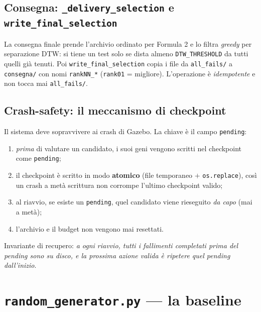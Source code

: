 \documentclass[11pt,a4paper]{report}
\newcommand{\code}[1]{\texttt{#1}}
\begin{document}
\subsection{Consegna: \texttt{\_delivery\_selection} e \texttt{write\_final\_selection}}
La consegna finale prende l'archivio ordinato per Formula 2 e lo filtra
\emph{greedy} per separazione DTW: si tiene un test solo se dista almeno
\code{DTW\_THRESHOLD} da tutti quelli già tenuti. Poi
\code{write\_final\_selection} copia i file da \code{all\_fails/} a
\code{consegna/} con nomi \code{rankNN\_*} (\code{rank01} = migliore).
L'operazione è \emph{idempotente} e non tocca mai \code{all\_fails/}.

\subsection{Crash-safety: il meccanismo di checkpoint}
Il sistema deve sopravvivere ai crash di Gazebo. La chiave è il campo
\code{pending}:
\begin{enumerate}
  \item \emph{prima} di valutare un candidato, i suoi geni vengono
        scritti nel checkpoint come \code{pending};
  \item il checkpoint è scritto in modo \textbf{atomico} (file temporaneo
        $+$ \code{os.replace}), così un crash a metà scrittura non
        corrompe l'ultimo checkpoint valido;
  \item al riavvio, se esiste un \code{pending}, quel candidato viene
        rieseguito \emph{da capo} (mai a metà);
  \item l'archivio e il budget non vengono mai resettati.
\end{enumerate}
Invariante di recupero: \emph{a ogni riavvio, tutti i fallimenti
completati prima del pending sono su disco, e la prossima azione valida
è ripetere quel pending dall'inizio}.

\section{\texttt{random\_generator.py} --- la baseline}
\label{sec:random}
\end{document}
